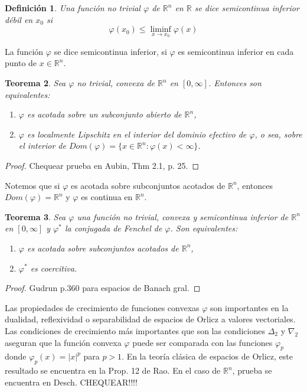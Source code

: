 \documentclass[a4paper,11pt]{amsart}
\theoremstyle{plain}
\newtheorem{thm}{Teorema}[section]
\newtheorem{defi}[thm]{Definici\'on}
\theoremstyle{remark}
\theoremstyle{remark}
\newcommand{\rr}{\mathbb{R}}
\numberwithin{equation}{section}
\begin{document}
\begin{defi}
Una funci\'on no trivial  $\varphi$ de $\rr^n$ en $\rr$ se dice semicontinua inferior d\'ebil en $x_0$ si 
\[
\varphi(x_0)\leq \liminf\limits_{x\to x_0} \varphi(x)
\]
\end{defi}

La funci\'on  $\varphi$ se dice semicontinua inferior, si $\varphi$ es semicontinua inferior en cada punto de $x\in\rr^n$.
\begin{thm}
Sea $\varphi$ no trivial, convexa de $\rr^n$ en $[0,\infty]$. Entonces son equivalentes:
\begin{enumerate}
\item $\varphi$ es acotada sobre un subconjunto abierto de $\rr^n$,
\item $\varphi$ es localmente Lipschitz en el interior del dominio efectivo de $\varphi$, o sea, sobre
el interior de $Dom(\varphi)=\{x \in \rr^n: \varphi(x)<\infty\}$.
\end{enumerate}
\end{thm}

\begin{proof} 
Chequear prueba en Aubin, Thm 2.1, p. 25.
\end{proof}

Notemos que si $\varphi$ es acotada sobre subconjuntos acotados de $\rr^n$, entonces $Dom(\varphi)=\rr^n$ y $\varphi$ es continua en $\rr^n$.

\begin{thm}
Sea $\varphi$ una funci\'on no trivial, convexa y semicontinua inferior de $\rr^n$ en $[0,\infty]$ y $\varphi^*$ la conjugada de Fenchel de $\varphi$. Son equivalentes:
\begin{enumerate}
\item $\varphi$ es acotada sobre subconjuntos acotados de $\rr^n$,
\item $\varphi^*$ es coercitiva.
\end{enumerate}
\end{thm}


\begin{proof}
Gudrun p.360 para espacios de Banach gral.
\end{proof}

Las propiedades de crecimiento de funciones convexas $\varphi$ son importantes en la dualidad, reflexividad o separabilidad de espacios de Orlicz a valores vectoriales.  Las condiciones de crecimiento m\'as importantes que son las condiciones $\Delta_2$ y $\nabla_2$ aseguran que la funci\'on convexa $\varphi$ puede ser comparada con las funciones $\varphi_p$ donde $\varphi_p(x)=|x|^p$ para $p>1$. En la teor\'ia cl\'asica de espacios de Orlicz, este resultado se encuentra en la Prop. 12 de Rao. En el caso de $\rr^n$, prueba se encuentra en Desch. CHEQUEAR!!!!
\end{document}
